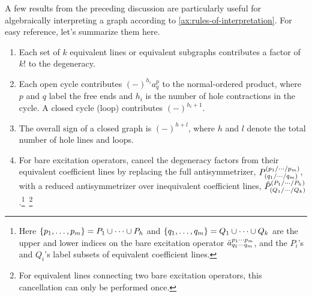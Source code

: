\documentclass[11pt]{article}
\numberwithin{equation}{section}
\begin{document}
\begin{rmk}\label{rmk:useful-rules}
A few results from the preceding discussion are particularly useful for algebraically interpreting a graph according to \cref{ax:rules-of-interpretation}.
For easy reference, let's summarize them here.
\begin{enumerate}
\item
  Each set of $k$ equivalent lines or equivalent subgraphs contributes a factor of $k!$ to the degeneracy.
\item
  Each open cycle contributes $(-)^{h_i}a^p_q$ to the normal-ordered product, where $p$ and $q$ label the free ends and $h_i$ is the number of hole contractions in the cycle.
  A closed cycle (loop) contributes $(-)^{h_i+1}$.
\item
  The overall sign of a closed graph is $(-)^{h+l}$, where $h$ and $l$ denote the total number of hole lines and loops.
\item\label{item:rule-for-coefficient-lines}
  For bare excitation operators, cancel the degeneracy factors from their equivalent coefficient lines by replacing the full antisymmetrizer, $P^{(p_1/\cdots/p_m)}_{(q_1/\cdots/q_m)}$, with a reduced antisymmetrizer over inequivalent coefficient lines, $\hat{P}^{(P_1/\cdots /P_h)}_{(Q_1/\cdots /Q_k)}$.\footnote{
  Here $\{p_1,\ldots,p_m\}=P_1\cup\cdots\cup P_h$ and $\{q_1,\ldots,q_m\}=Q_1\cup\cdots\cup Q_k$ are the upper and lower indices on the bare excitation operator $\tilde{a}^{p_1\cdots p_m}_{q_1\cdots q_m}$, and the $P_i$'s and $Q_i$'s label subsets of equivalent coefficient lines.
}~\footnote{
  For equivalent lines connecting two bare excitation operators, this cancellation can only be performed once.
}
\end{enumerate}
\end{rmk}
\end{document}
